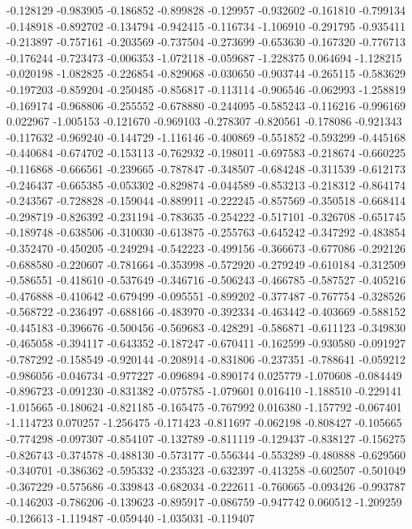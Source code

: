 -0.128129
-0.983905
-0.186852
-0.899828
-0.129957
-0.932602
-0.161810
-0.799134
-0.148918
-0.892702
-0.134794
-0.942415
-0.116734
-1.106910
-0.291795
-0.935411
-0.213897
-0.757161
-0.203569
-0.737504
-0.273699
-0.653630
-0.167320
-0.776713
-0.176244
-0.723473
-0.006353
-1.072118
-0.059687
-1.228375
0.064694
-1.128215
-0.020198
-1.082825
-0.226854
-0.829068
-0.030650
-0.903744
-0.265115
-0.583629
-0.197203
-0.859204
-0.250485
-0.856817
-0.113114
-0.906546
-0.062993
-1.258819
-0.169174
-0.968806
-0.255552
-0.678880
-0.244095
-0.585243
-0.116216
-0.996169
0.022967
-1.005153
-0.121670
-0.969103
-0.278307
-0.820561
-0.178086
-0.921343
-0.117632
-0.969240
-0.144729
-1.116146
-0.400869
-0.551852
-0.593299
-0.445168
-0.440684
-0.674702
-0.153113
-0.762932
-0.198011
-0.697583
-0.218674
-0.660225
-0.116868
-0.666561
-0.239665
-0.787847
-0.348507
-0.684248
-0.311539
-0.612173
-0.246437
-0.665385
-0.053302
-0.829874
-0.044589
-0.853213
-0.218312
-0.864174
-0.243567
-0.728828
-0.159044
-0.889911
-0.222245
-0.857569
-0.350518
-0.668414
-0.298719
-0.826392
-0.231194
-0.783635
-0.254222
-0.517101
-0.326708
-0.651745
-0.189748
-0.638506
-0.310030
-0.613875
-0.255763
-0.645242
-0.347292
-0.483854
-0.352470
-0.450205
-0.249294
-0.542223
-0.499156
-0.366673
-0.677086
-0.292126
-0.688580
-0.220607
-0.781664
-0.353998
-0.572920
-0.279249
-0.610184
-0.312509
-0.586551
-0.418610
-0.537649
-0.346716
-0.506243
-0.466785
-0.587527
-0.405216
-0.476888
-0.410642
-0.679499
-0.095551
-0.899202
-0.377487
-0.767754
-0.328526
-0.568722
-0.236497
-0.688166
-0.483970
-0.392334
-0.463442
-0.403669
-0.588152
-0.445183
-0.396676
-0.500456
-0.569683
-0.428291
-0.586871
-0.611123
-0.349830
-0.465058
-0.394117
-0.643352
-0.187247
-0.670411
-0.162599
-0.930580
-0.091927
-0.787292
-0.158549
-0.920144
-0.208914
-0.831806
-0.237351
-0.788641
-0.059212
-0.986056
-0.046734
-0.977227
-0.096894
-0.890174
0.025779
-1.070608
-0.084449
-0.896723
-0.091230
-0.831382
-0.075785
-1.079601
0.016410
-1.188510
-0.229141
-1.015665
-0.180624
-0.821185
-0.165475
-0.767992
0.016380
-1.157792
-0.067401
-1.114723
0.070257
-1.256475
-0.171423
-0.811697
-0.062198
-0.808427
-0.105665
-0.774298
-0.097307
-0.854107
-0.132789
-0.811119
-0.129437
-0.838127
-0.156275
-0.826743
-0.374578
-0.488130
-0.573177
-0.556344
-0.553289
-0.480888
-0.629560
-0.340701
-0.386362
-0.595332
-0.235323
-0.632397
-0.413258
-0.602507
-0.501049
-0.367229
-0.575686
-0.339843
-0.682034
-0.222611
-0.760665
-0.093426
-0.993787
-0.146203
-0.786206
-0.139623
-0.895917
-0.086759
-0.947742
0.060512
-1.209259
-0.126613
-1.119487
-0.059440
-1.035031
-0.119407
